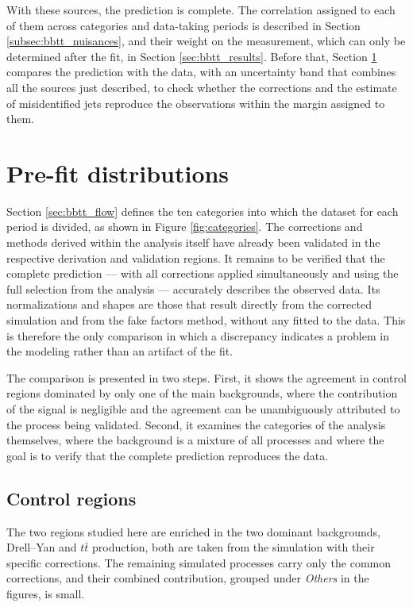    


With these sources, the prediction is complete. The correlation assigned to each of them across categories and data-taking periods is described in Section \ref{subsec:bbtt_nuisances}, and their weight on the measurement, which can only be determined after the fit, in Section \ref{sec:bbtt_results}. Before that, Section \ref{sec:bbtt_controlplots} compares the prediction with the data, with an uncertainty band that combines all the sources just described, to check whether the corrections and the estimate of misidentified jets reproduce the observations within the margin assigned to them.
    


\section{Pre-fit distributions}
\label{sec:bbtt_controlplots}
%
Section \ref{sec:bbtt_flow} defines the ten categories into which the dataset for each period is divided, as shown in Figure \ref{fig:categories}. The corrections and methods derived within the analysis itself have already been validated  in the respective derivation and validation regions. It remains to be verified that the complete prediction — with all corrections applied simultaneously and using the full selection from the analysis — accurately describes the observed data. Its normalizations and shapes are those that result directly from the corrected simulation and from the fake factors method, without any fitted to the data. This is therefore the only comparison in which a discrepancy indicates a problem in the modeling rather than an artifact of the fit.

The comparison is presented in two steps. First, it shows the agreement in control regions dominated by only one of the main backgrounds, where the contribution of the signal is negligible and the agreement can be unambiguously attributed to the process being validated. Second, it examines the categories of the analysis themselves, where the background is a mixture of all processes and where the goal is to verify that the complete prediction reproduces the data.



\subsection{Control regions}
\label{subsec:bbtt_cr}
%
The two regions studied here are enriched in the two dominant backgrounds, Drell--Yan and $t\bar{t}$ production, both are taken from the simulation with their specific corrections. The remaining simulated processes carry only the common corrections, and their combined contribution, grouped under \textit{Others} in the figures, is small.\medskip

